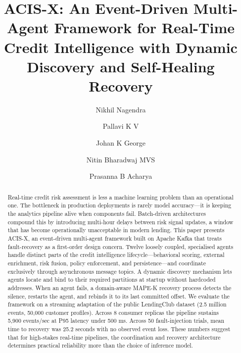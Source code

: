 \documentclass[runningheads]{llncs}
\begin{document}
\title{ACIS-X: An Event-Driven Multi-Agent Framework for Real-Time Credit Intelligence with Dynamic Discovery and Self-Healing Recovery}


\author{Nikhil Nagendra \and
Pallavi K V \and
Johan K George \and
Nitin Bharadwaj MVS \and
Prasanna B Acharya}



\maketitle

\begin{abstract}
Real-time credit risk assessment is less a machine learning problem than an operational one. The bottleneck in production deployments is rarely model accuracy---it is keeping the analytics pipeline alive when components fail. Batch-driven architectures compound this by introducing multi-hour delays between risk signal updates, a window that has become operationally unacceptable in modern lending. This paper presents ACIS-X, an event-driven multi-agent framework built on Apache Kafka that treats fault-recovery as a first-order design concern. Twelve loosely coupled, specialised agents handle distinct parts of the credit intelligence lifecycle---behavioral scoring, external enrichment, risk fusion, policy enforcement, and persistence---and coordinate exclusively through asynchronous message topics. A dynamic discovery mechanism lets agents locate and bind to their required partitions at startup without hardcoded addresses. When an agent fails, a domain-aware MAPE-K recovery process detects the silence, restarts the agent, and rebinds it to its last committed offset. We evaluate the framework on a streaming adaptation of the public LendingClub dataset (2.5 million events, 50,000 customer profiles). Across 8 consumer replicas the pipeline sustains 5,900 events/sec at P95 latency under 500 ms. Across 50 fault-injection trials, mean time to recovery was 25.2 seconds with no observed event loss. These numbers suggest that for high-stakes real-time pipelines, the coordination and recovery architecture determines practical reliability more than the choice of inference model.
\end{abstract}
\end{document}
